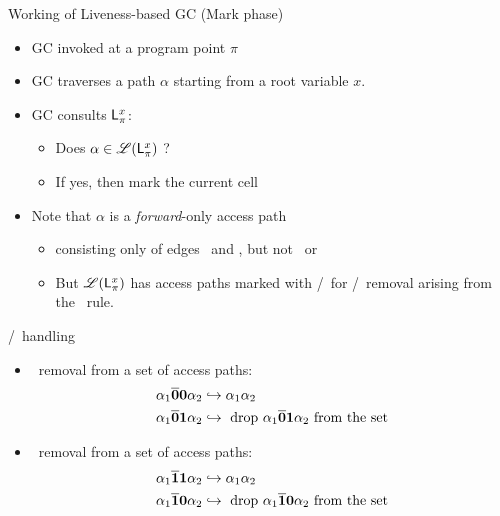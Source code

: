 \begin{frame}{Working of Liveness-based GC (Mark phase)}
  \begin{itemize}
  \item GC invoked at a program point $\pi$
  \item GC traverses a path $\alpha$ starting from a root variable $x$.
  \item GC consults $\mathsf{L}_{{\pi}}^{x}$: 
    \begin{itemize}
    \item Does $\alpha \in \mathscr{L}(\mathsf{L}_{{\pi}}^{x})$ ?
    \item If yes, then mark the current cell
    \end{itemize}
    \pause
  \item  Note  that  $\alpha$  is a  {\em  forward}-only  access  path
    \begin{itemize}
    \item consisting  only of  edges \acar\  and \acdr,  but not  \bcar\ or
      \bcdr
    \item But $\mathscr{L}(\mathsf{L}_{{\pi}}^{x})$ has access paths marked with \bcar/\bcdr\ for \acar/\acdr\  removal
  arising from the \CONS\  rule.
    \end{itemize}
  \end{itemize}
\end{frame}
\begin{frame}{\bcar/\bcdr\ handling}

\begin{itemize}
\item \acar\   removal from a set of access paths:
\begin{align*}
\alpha_1\overline{\mathbf{0}}\mathbf{0}\alpha_2 &\hookrightarrow
  \alpha_1\alpha_2\\
\alpha_1\overline{\mathbf{0}} \mathbf{1}\alpha_2 &\hookrightarrow
  \mbox{ drop $\alpha_1\overline{\mathbf{0}} \mathbf{1} \alpha_2$ from the set}
\end{align*}
\item \acdr\   removal from a set of access paths:
\begin{align*}
\alpha_1\overline{\mathbf{1}}\mathbf{1}\alpha_2 &\hookrightarrow
  \alpha_1\alpha_2\\
\alpha_1\overline{\mathbf{1}} \mathbf{0}\alpha_2 &\hookrightarrow
  \mbox{ drop $\alpha_1\overline{\mathbf{1}} \mathbf{0} \alpha_2$ from the set}
\end{align*}
\end{itemize}

\end{frame}
